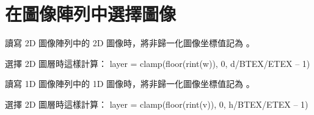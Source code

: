 \section{在圖像陣列中選擇圖像}

讀寫 2D 圖像陣列中的 2D 圖像時，將非歸一化圖像坐標值記為 。

選擇 2D 圖層時這樣計算：
\startclc
layer = clamp(floor(rint(w)), 0, d/BTEX/ETEX – 1)
\stopclc

讀寫 1D 圖像陣列中的 1D 圖像時，將非歸一化圖像坐標值記為 。

選擇 2D 圖層時這樣計算：
\startclc
layer = clamp(floor(rint(v)), 0, h/BTEX/ETEX – 1)
\stopclc
